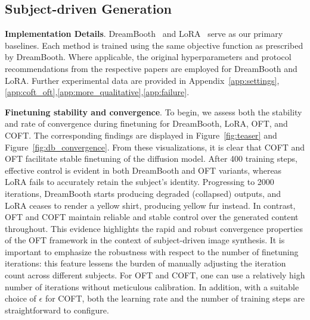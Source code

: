 \subsection{Subject-driven Generation}

\textbf{Implementation Details}. DreamBooth~\cite{ruiz2023dreambooth} and LoRA~\cite{hulora2022} serve as our primary baselines. Each method is trained using the same objective function as prescribed by DreamBooth. Where applicable, the original hyperparameters and protocol recommendations from the respective papers are employed for DreamBooth and LoRA. Further experimental data are provided in Appendix~\ref{app:settings},\ref{app:coft_oft},\ref{app:more_qualitative},\ref{app:failure}.

\textbf{Finetuning stability and convergence}. To begin, we assess both the stability and rate of convergence during finetuning for DreamBooth, LoRA, OFT, and COFT. The corresponding findings are displayed in Figure~\ref{fig:teaser} and Figure~\ref{fig:db_convergence}. From these visualizations, it is clear that COFT and OFT facilitate stable finetuning of the diffusion model. After 400 training steps, effective control is evident in both DreamBooth and OFT variants, whereas LoRA fails to accurately retain the subject’s identity. Progressing to 2000 iterations, DreamBooth starts producing degraded (collapsed) outputs, and LoRA ceases to render a yellow shirt, producing yellow fur instead. In contrast, OFT and COFT maintain reliable and stable control over the generated content throughout. This evidence highlights the rapid and robust convergence properties of the OFT framework in the context of subject-driven image synthesis. It is important to emphasize the robustness with respect to the number of finetuning iterations: this feature lessens the burden of manually adjusting the iteration count across different subjects. For OFT and COFT, one can use a relatively high number of iterations without meticulous calibration. In addition, with a suitable choice of $\epsilon$ for COFT, both the learning rate and the number of training steps are straightforward to configure.

